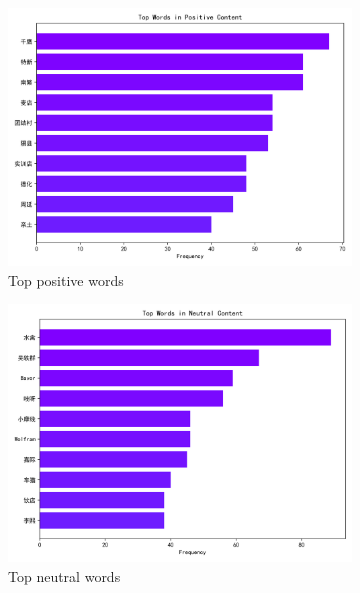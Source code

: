 \documentclass[12pt]{article}
\begin{document}
\begin{figure}[!ht]
	\centering
	\begin{subfigure}[b]{0.32\textwidth}
	\includegraphics[width=\linewidth]{top_words_positive.png}
	\caption{Top positive words}
	\end{subfigure}
	\hfill
	\begin{subfigure}[b]{0.32\textwidth}
	\includegraphics[width=\linewidth]{top_words_neutral.png}
	\caption{Top neutral words}
	\end{subfigure}
	\hfill
	\begin{subfigure}[b]{0.32\textwidth}

\end{subfigure}
\end{figure}
\end{document}
